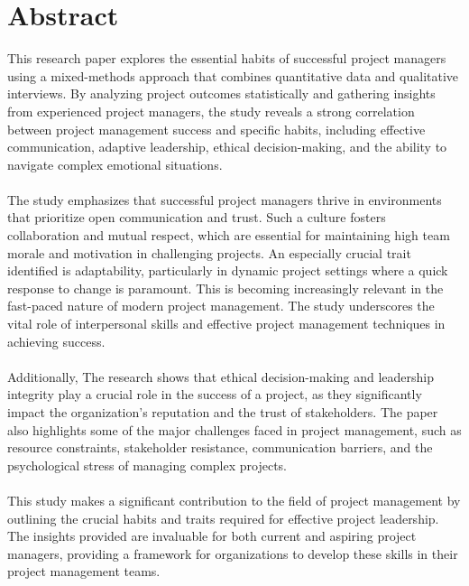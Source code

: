\documentclass{article}
\begin{document}
\section{Abstract}
This research paper explores the essential habits of successful project managers using a mixed-methods approach that combines quantitative data and qualitative interviews. By analyzing project outcomes statistically and gathering insights from experienced project managers, the study reveals a strong correlation between project management success and specific habits, including effective communication, adaptive leadership, ethical decision-making, and the ability to navigate complex emotional situations\cite{Warner_Mark}\cite{Interpersonal_skills}.\\\\
The study emphasizes that successful project managers thrive in environments that prioritize open communication and trust. Such a culture fosters collaboration and mutual respect, which are essential for maintaining high team morale and motivation in challenging projects. An especially crucial trait identified is adaptability, particularly in dynamic project settings where a quick response to change is paramount. This is becoming increasingly relevant in the fast-paced nature of modern project management. The study underscores the vital role of interpersonal skills and effective project management techniques in achieving success\cite{Interpersonal_skills}\cite{Project_Management}\cite{Project_Management_Techniques}.\\\\
Additionally, The research shows that ethical decision-making and leadership integrity play a crucial role in the success of a project, as they significantly impact the organization's reputation and the trust of stakeholders. The paper also highlights some of the major challenges faced in project management, such as resource constraints, stakeholder resistance, communication barriers, and the psychological stress of managing complex projects\cite{relationship_between_project_manage}.\\\\
This study makes a significant contribution to the field of project management by outlining the crucial habits and traits required for effective project leadership. The insights provided are invaluable for both current and aspiring project managers, providing a framework for organizations to develop these skills in their project management teams.

\newpage
\end{document}

